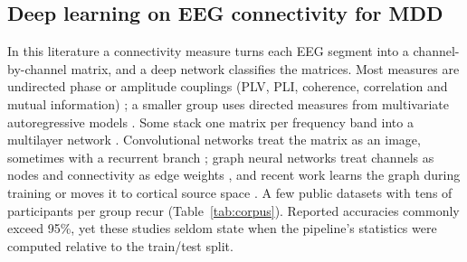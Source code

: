 
\subsection{Deep learning on EEG connectivity for MDD}
In this literature a connectivity measure turns each EEG segment into a channel-by-channel matrix, and a deep network classifies the matrices. Most measures are undirected phase or amplitude couplings (PLV, PLI, coherence, correlation and mutual information) \cite{li2020,dang2020,zhang2023,yu2022,liu2024}; a smaller group uses directed measures from multivariate autoregressive models \cite{saeedi2021,khan2021}. Some stack one matrix per frequency band into a multilayer network \cite{dang2020,sun2022}. Convolutional networks treat the matrix as an image, sometimes with a recurrent branch \cite{saeedi2021,zhang2023,li2024}; graph neural networks treat channels as nodes and connectivity as edge weights \cite{sun2022,sun2024,liu2024}, and recent work learns the graph during training \cite{luo2023,xia2023} or moves it to cortical source space \cite{guo2025}. A few public datasets with tens of participants per group recur (Table~\ref{tab:corpus}). Reported accuracies commonly exceed 95\%, yet these studies seldom state when the pipeline's statistics were computed relative to the train/test split.

